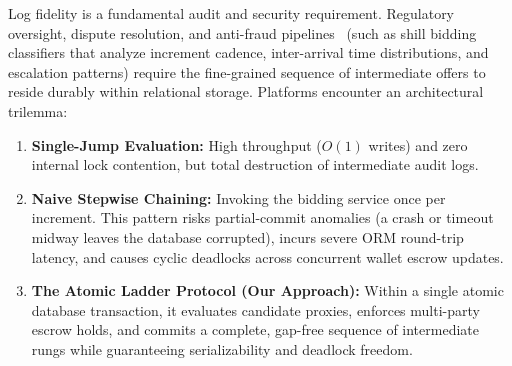 \documentclass[conference]{IEEEtran}
\begin{document}
Log fidelity is a fundamental audit and security requirement. Regulatory oversight,
dispute resolution, and anti-fraud pipelines~\cite{Trevathan2007,Ford2010} (such as
shill bidding classifiers that analyze increment cadence, inter-arrival time distributions,
and escalation patterns) require the fine-grained sequence of intermediate offers to
reside durably within relational storage. Platforms encounter an architectural trilemma:
\begin{enumerate}
  \item \textbf{Single-Jump Evaluation:} High throughput ($O(1)$ writes) and zero
    internal lock contention, but total destruction of intermediate audit logs.
  \item \textbf{Naive Stepwise Chaining:} Invoking the bidding service once per increment.
    This pattern risks partial-commit anomalies (a crash or timeout midway leaves the
    database corrupted), incurs severe ORM round-trip latency, and causes cyclic
    deadlocks across concurrent wallet escrow updates.
  \item \textbf{The Atomic Ladder Protocol (Our Approach):} Within a single atomic database
    transaction, it evaluates candidate proxies, enforces multi-party escrow holds,
    and commits a complete, gap-free sequence of intermediate rungs while guaranteeing
    serializability and deadlock freedom.
\end{enumerate}
\end{document}
